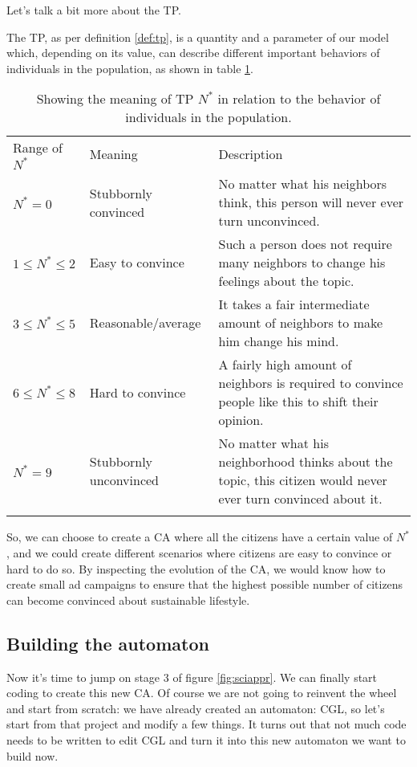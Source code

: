 Let's talk a bit more about the TP.

\begin{proposition}
The TP, as per definition \ref{def:tp}, is a quantity and a parameter of our model which,
depending on its value, can describe different important behaviors of individuals in the population,
as shown in table \ref{tab:meaningn}.
\end{proposition}

%
%
\begin{table}[!t]
\centering
\caption{Showing the meaning of TP $N^\ast$ in relation to the behavior of individuals
in the population.}
\label{tab:meaningn}
%
%
\begin{tabular}{p{}p{}p{}}
\hline\noalign{\smallskip}
Range of $N^\ast$ & Meaning & Description \\
\noalign{\smallskip}\svhline\noalign{\smallskip}
$N^\ast = 0$ & Stubbornly convinced & No matter what his
neighbors think, this person will never ever turn unconvinced.\\
$1 \leq N^\ast \leq 2$ & Easy to convince  & Such a person does not
require many neighbors to change his feelings about the topic.\\
$3 \leq N^\ast \leq 5$ & Reasonable/average & It takes a fair
intermediate amount of neighbors to make him change his mind.\\
$6 \leq N^\ast \leq 8$ & Hard to convince & A fairly high amount of
neighbors is required to convince people like this to shift their opinion.\\
$N^\ast = 9$ & Stubbornly unconvinced & No matter what his
neighborhood thinks about the topic, this citizen would never ever turn convinced about it.\\
\noalign{\smallskip}\hline\noalign{\smallskip}
\end{tabular}
\end{table}
%

So, we can choose to create a CA where all the citizens have a certain value of $N^\ast$, and
we could create different scenarios where citizens are easy to convince or hard to do so.
By inspecting the evolution of the CA, we would know how to create small ad campaigns to ensure
that the highest possible number of citizens can become convinced about sustainable lifestyle.

\subsection{Building the automaton}
Now it's time to jump on stage 3 of figure \ref{fig:sciappr}. We can finally start coding to
create this new CA. Of course we are not going to reinvent the wheel and start from scratch: we
have already created an automaton: CGL, so let's start from that project and modify a few things.
It turns out that not much code needs to be written to edit CGL and turn it into this new
automaton we want to build now.

